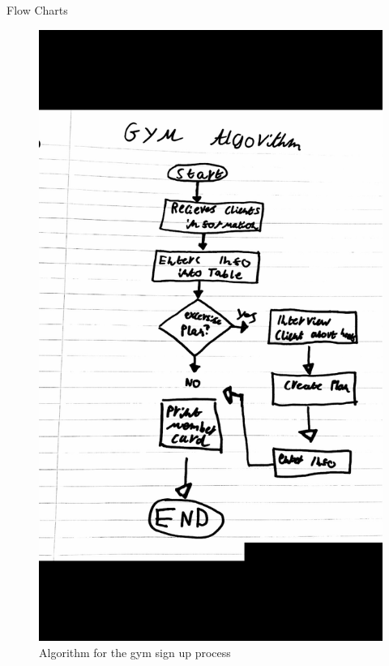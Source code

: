 Flow Charts

\begin{figure}[H]
    \includegraphics[width=\textwidth]{GymAlgorithm.jpg}
    \caption{Algorithm for the gym sign up process} \label{fig:Algorithm for the gym sign up process}
\end{figure}

